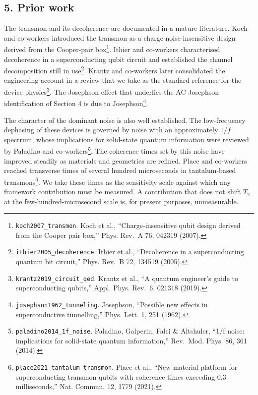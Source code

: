 \documentclass[
  11pt,
]{article}
\begin{document}
\hypertarget{prior-work}{%
\subsection{5. Prior work}\label{prior-work}}

The transmon and its decoherence are documented in a mature literature.
Koch and co-workers introduced the transmon as a
charge-noise-insensitive design derived from the Cooper-pair
box\footnote{\texttt{koch2007\_transmon}. Koch et al.,
  ``Charge-insensitive qubit design derived from the Cooper pair box,''
  Phys. Rev.~A 76, 042319 (2007).}. Ithier and co-workers characterised
decoherence in a superconducting qubit circuit and established the
channel decomposition still in use\footnote{\texttt{ithier2005\_decoherence}.
  Ithier et al., ``Decoherence in a superconducting quantum bit
  circuit,'' Phys. Rev.~B 72, 134519 (2005).}. Krantz and co-workers
later consolidated the engineering account in a review that we take as
the standard reference for the device physics\footnote{\texttt{krantz2019\_circuit\_qed}.
  Krantz et al., ``A quantum engineer's guide to superconducting
  qubits,'' Appl. Phys. Rev.~6, 021318 (2019).}. The Josephson effect
that underlies the AC-Josephson identification of Section 4 is due to
Josephson\footnote{\texttt{josephson1962\_tunneling}. Josephson,
  ``Possible new effects in superconductive tunnelling,'' Phys. Lett. 1,
  251 (1962).}.

The character of the dominant noise is also well established. The
low-frequency dephasing of these devices is governed by noise with an
approximately \(1/f\) spectrum, whose implications for solid-state
quantum information were reviewed by Paladino and co-workers\footnote{\texttt{paladino2014\_1f\_noise}.
  Paladino, Galperin, Falci \& Altshuler, ``1/f noise: implications for
  solid-state quantum information,'' Rev.~Mod. Phys. 86, 361 (2014).}.
The coherence times set by this noise have improved steadily as
materials and geometries are refined. Place and co-workers reached
transverse times of several hundred microseconds in tantalum-based
transmons\footnote{\texttt{place2021\_tantalum\_transmon}. Place et al.,
  ``New material platform for superconducting transmon qubits with
  coherence times exceeding 0.3 milliseconds,'' Nat. Commun. 12, 1779
  (2021).}. We take these times as the sensitivity scale against which
any framework contribution must be measured. A contribution that does
not shift \(T_2\) at the few-hundred-microsecond scale is, for present
purposes, unmeasurable.
\end{document}
